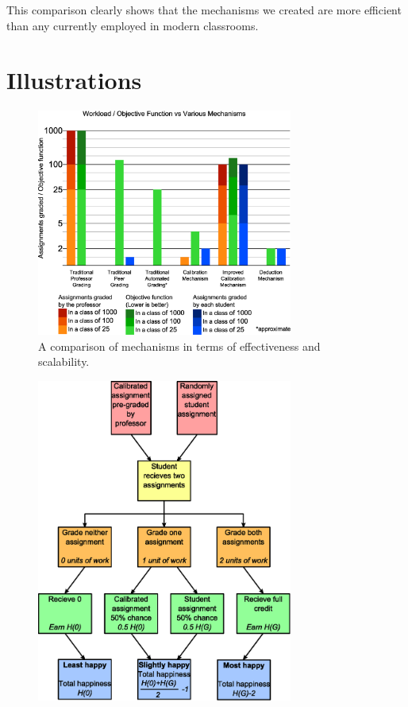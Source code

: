 \documentclass[12pt, Arial]{article}
\begin{document}
This comparison clearly shows that the mechanisms we created are more efficient than any currently employed in modern classrooms.
\newpage
\section{Illustrations}
{
\noindent
\begin{figure}[!h]
	\centering
		\includegraphics[width=0.75\textwidth]{Comparison.eps}
		\caption {A comparison of mechanisms in terms of effectiveness and scalability.\label{fig:comparison}}
\end{figure}
\begin{figure}
	\centering
		\includegraphics[width=0.75\textwidth]{Flowchart-Calibration.eps}

\end{figure}}
\end{document}
